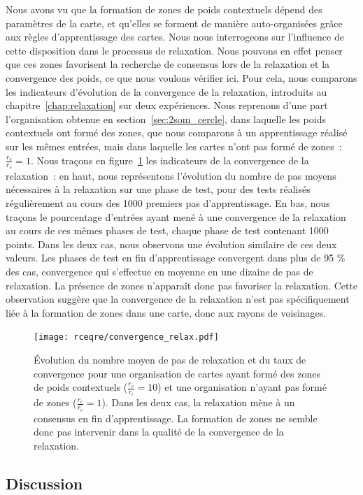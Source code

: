 \documentclass[../main]{subfiles}
\begin{document}
Nous avons vu que la formation de zones de poids contextuels dépend des paramètres de la carte, et qu'elles se forment de manière auto-organisées grâce aux règles d'apprentissage des cartes.
Nous nous interrogeons sur l'influence de cette disposition dans le processus de relaxation.
Nous pouvons en effet penser que ces zones favorisent la recherche de consensus lors de la relaxation et la convergence des poids, ce que nous voulons vérifier ici.
Pour cela, nous comparons les indicateurs d'évolution de la convergence de la relaxation, introduits au chapitre~\ref{chap:relaxation} sur deux expériences.
Nous reprenons d'une part l'organisation obtenue en section~\ref{sec:2som_cercle}, dans laquelle les poids contextuels ont formé des zones, que nous comparons à un apprentissage réalisé sur les mêmes entrées, mais dans laquelle les cartes n'ont pas formé de zones~: $\frac{r_e}{r_c} = 1$. 
Nous traçons en figure~\ref{fig:conv_rcre} les indicateurs de la convergence de la relaxation~: en haut, nous représentons l'évolution du nombre de pas moyens nécessaires à la relaxation sur une phase de test, pour des tests réalisés régulièrement au cours des 1000 premiers pas d'apprentissage.
En bas, nous traçons le pourcentage d'entrées ayant mené à une convergence de la relaxation au cours de ces mêmes phases de test, chaque phase de test contenant 1000 points.
Dans les deux cas, nous observons une évolution similaire de ces deux valeurs. Les phases de test en fin d'apprentissage convergent dans plus de 95 \% des cas, convergence qui s'effectue en moyenne en une dizaine de pas de relaxation.
La présence de zones n'apparaît donc pas favoriser la relaxation.
Cette observation suggère que la convergence de la relaxation n'est pas spécifiquement liée à la formation de zones dans une carte, donc aux rayons de voisinages.

\begin{figure}[hb]
	\centering\texttt{[image: rceqre/convergence\_relax.pdf]}
	\caption{\'Evolution du nombre moyen de pas de relaxation et du taux de convergence pour une organisation de cartes ayant formé des zones de poids contextuels ($\frac{r_e}{r_c} = 10$) et une organisation n'ayant pas formé de zones ($\frac{r_e}{r_c} = 1$). Dans les deux cas, la relaxation mène à un consensus en fin d'apprentissage. La formation de zones ne semble donc pas intervenir dans la qualité de la convergence de la relaxation. \label{fig:conv_rcre}}
\end{figure}

\subsection{Discussion}
\end{document}
